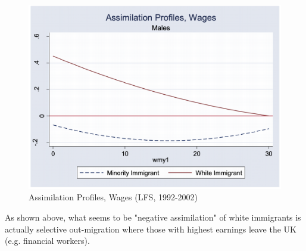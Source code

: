             \begin{figure}[H]
                \centering
                \includegraphics[width=4.5in]{images/ch11/11_selective_outmig_1.png}
                \caption{Assimilation Profiles, Wages (LFS, 1992-2002)}
            \end{figure}
    
            As shown above, what seems to be "negative assimilation" of white immigrants is actually selective out-migration where those with highest earnings leave the UK (e.g. financial workers).
    
            
    
            